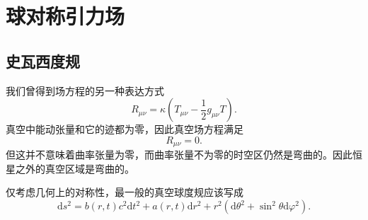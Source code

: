 \documentclass[11pt, a4paper, oneside, onecolumn]{ctexart}
\numberwithin{equation}{subsection}
\begin{document}
\newpage
\section{球对称引力场}
\subsection{史瓦西度规}
我们曾得到场方程的另一种表达方式
\begin{equation}
R_{\mu\nu}=\kappa\left(T_{\mu\nu}-\frac12g_{\mu\nu}T\right).
\end{equation}
真空中能动张量和它的迹都为零，因此真空场方程满足
\begin{equation}
R_{\mu\nu}=0.
\end{equation}
但这并不意味着曲率张量为零，而曲率张量不为零的时空区仍然是弯曲的。因此恒星之外的真空区域是弯曲的。

仅考虑几何上的对称性，最一般的真空球度规应该写成
\begin{equation}
\mathrm{d}s^{2}=b\left(r,t\right)c^{2}\mathrm{d}t^{2}+a\left(r,t\right)\mathrm{d}r^{2}+r^{2}\left(\mathrm{d}\theta^{2}+\sin^{2}\theta\mathrm{d}\varphi^{2}\right).
\end{equation}
\end{document}
